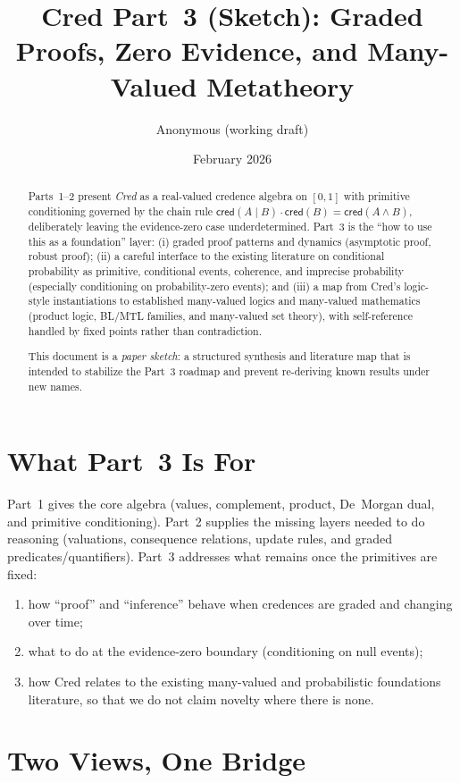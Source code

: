\documentclass[11pt,a4paper]{article}
\title{\textbf{Cred Part~3 (Sketch): Graded Proofs, Zero Evidence, and Many-Valued Metatheory}}
\author{Anonymous (working draft)}
\date{February 2026}
\newcommand{\cred}{\mathsf{cred}}
\begin{document}
\maketitle

\begin{abstract}
Parts~1--2 present \emph{Cred} as a real-valued credence algebra on $[0,1]$ with
primitive conditioning governed by the chain rule
$\cred(A \mid B) \cdot \cred(B) = \cred(A \land B)$, deliberately leaving the
evidence-zero case underdetermined.  Part~3 is the ``how to use this as a
foundation'' layer: (i) graded proof patterns and dynamics (asymptotic proof,
robust proof); (ii) a careful interface to the existing literature on
conditional probability as primitive, conditional events, coherence, and
imprecise probability (especially conditioning on probability-zero events);
and (iii) a map from Cred's logic-style instantiations to established many-valued
logics and many-valued mathematics (product logic, BL/MTL families, and
many-valued set theory), with self-reference handled by fixed points rather than
contradiction.

This document is a \emph{paper sketch}: a structured synthesis and literature
map that is intended to stabilize the Part~3 roadmap and prevent re-deriving
known results under new names.
\end{abstract}

\section{What Part~3 Is For}

Part~1 gives the core algebra (values, complement, product, De~Morgan dual, and
primitive conditioning).  Part~2 supplies the missing layers needed to do
reasoning (valuations, consequence relations, update rules, and graded
predicates/quantifiers).  Part~3 addresses what remains once the primitives are
fixed:
\begin{enumerate}[label=(\roman*),nosep]
\item how ``proof'' and ``inference'' behave when credences are graded and
changing over time;
\item what to do at the evidence-zero boundary (conditioning on null events);
\item how Cred relates to the existing many-valued and probabilistic foundations
literature, so that we do not claim novelty where there is none.
\end{enumerate}

\section{Two Views, One Bridge}
\end{document}
